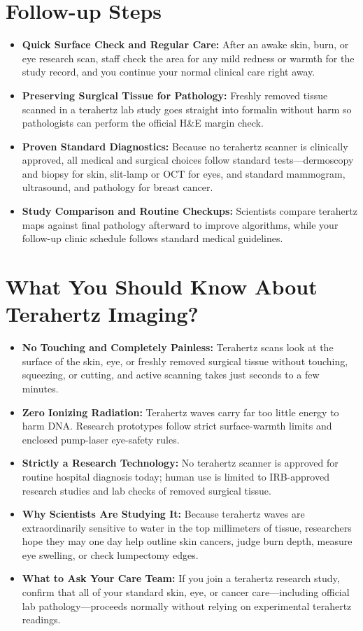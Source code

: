 \section{Follow-up Steps}
\begin{itemize}
  \item \textbf{Quick Surface Check and Regular Care:} After an awake skin, burn, or eye research scan, staff check the area for any mild redness or warmth for the study record, and you continue your normal clinical care right away.
  \item \textbf{Preserving Surgical Tissue for Pathology:} Freshly removed tissue scanned in a terahertz lab study goes straight into formalin without harm so pathologists can perform the official H\&E margin check.
  \item \textbf{Proven Standard Diagnostics:} Because no terahertz scanner is clinically approved, all medical and surgical choices follow standard tests---dermoscopy and biopsy for skin, slit-lamp or OCT for eyes, and standard mammogram, ultrasound, and pathology for breast cancer.
  \item \textbf{Study Comparison and Routine Checkups:} Scientists compare terahertz maps against final pathology afterward to improve algorithms, while your follow-up clinic schedule follows standard medical guidelines.
\end{itemize}

\section{What You Should Know About Terahertz Imaging?}
\begin{itemize}
  \item \textbf{No Touching and Completely Painless:} Terahertz scans look at the surface of the skin, eye, or freshly removed surgical tissue without touching, squeezing, or cutting, and active scanning takes just seconds to a few minutes.
  \item \textbf{Zero Ionizing Radiation:} Terahertz waves carry far too little energy to harm DNA. Research prototypes follow strict surface-warmth limits and enclosed pump-laser eye-safety rules.
  \item \textbf{Strictly a Research Technology:} No terahertz scanner is approved for routine hospital diagnosis today; human use is limited to IRB-approved research studies and lab checks of removed surgical tissue.
  \item \textbf{Why Scientists Are Studying It:} Because terahertz waves are extraordinarily sensitive to water in the top millimeters of tissue, researchers hope they may one day help outline skin cancers, judge burn depth, measure eye swelling, or check lumpectomy edges.
  \item \textbf{What to Ask Your Care Team:} If you join a terahertz research study, confirm that all of your standard skin, eye, or cancer care---including official lab pathology---proceeds normally without relying on experimental terahertz readings.
\end{itemize}

